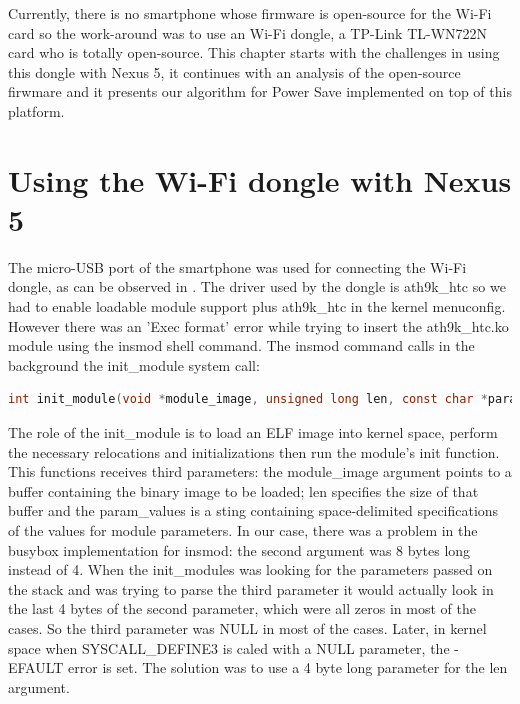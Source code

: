 Currently, there is no smartphone whose firmware is open-source for the Wi-Fi card so the work-around was to use an Wi-Fi dongle, a TP-Link TL-WN722N card \cite{cite-tplink} who is totally open-source. This chapter starts with the challenges in using this dongle with Nexus 5, it continues with an analysis of the open-source firwmare and it presents our algorithm for Power Save implemented on top of this platform.

\section{Using the Wi-Fi dongle with Nexus 5}
\label{sec:donglesmartphone}

The micro-USB port of the smartphone was used for connecting the Wi-Fi dongle, as can be observed in . The driver used by the dongle is ath9k_htc so we had to enable loadable module support plus ath9k_htc in the kernel menuconfig. However there was an 'Exec format' error while trying to insert the ath9k_htc.ko module using the insmod shell command. The insmod command calls in the background the init_module system call:

\begin{lstlisting}[language=C, frame=single, caption={init_module system call},label=InterfaceCombinations]
int init_module(void *module_image, unsigned long len, const char *param_values);
\end{lstlisting}


The role of the init_module is to load an ELF image into kernel space, perform the necessary relocations and initializations then run the module's init function. This functions receives third parameters: the module_image argument points to a buffer containing the binary image to be loaded; len specifies the size of that buffer and the param_values is a sting containing space-delimited specifications of the values for module parameters. In our case, there was a problem in the busybox implementation for insmod: the second argument was 8 bytes long instead of 4. When the init_modules was looking for the parameters passed on the stack and was trying to parse the third parameter it would actually look in the last 4 bytes of the second parameter, which were all zeros in most of the cases. So the third parameter was NULL in most of the cases. Later, in kernel space when SYSCALL_DEFINE3 is caled with a NULL parameter, the -EFAULT error is set. The solution was to use a 4 byte long parameter for the len argument.


